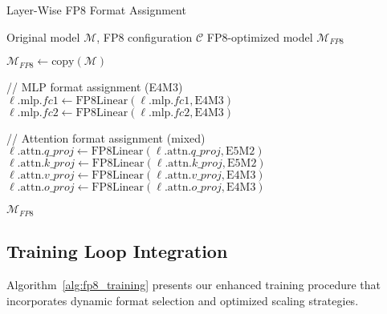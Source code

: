 \documentclass[conference]{IEEEtran}
\begin{document}
\begin{algorithm}[hbt!]
\caption{Layer-Wise FP8 Format Assignment}
\label{alg:layer_replacement}
\begin{algorithmic}
\Require Original model $\mathcal{M}$, FP8 configuration $\mathcal{C}$
\Ensure FP8-optimized model $\mathcal{M}_{FP8}$

\State $\mathcal{M}_{FP8} \gets \text{copy}(\mathcal{M})$

    \State // MLP format assignment (E4M3)
    \State $\ell.\text{mlp}.fc1 \gets \text{FP8Linear}(\ell.\text{mlp}.fc1, \text{E4M3})$
    \State $\ell.\text{mlp}.fc2 \gets \text{FP8Linear}(\ell.\text{mlp}.fc2, \text{E4M3})$
    
    \State // Attention format assignment (mixed)
    \State $\ell.\text{attn}.q\_proj \gets \text{FP8Linear}(\ell.\text{attn}.q\_proj, \text{E5M2})$
    \State $\ell.\text{attn}.k\_proj \gets \text{FP8Linear}(\ell.\text{attn}.k\_proj, \text{E5M2})$
    \State $\ell.\text{attn}.v\_proj \gets \text{FP8Linear}(\ell.\text{attn}.v\_proj, \text{E4M3})$
    \State $\ell.\text{attn}.o\_proj \gets \text{FP8Linear}(\ell.\text{attn}.o\_proj, \text{E4M3})$
\EndFor

\State \Return $\mathcal{M}_{FP8}$
\end{algorithmic}
\end{algorithm}

\subsection{Training Loop Integration}

Algorithm~\ref{alg:fp8_training} presents our enhanced training procedure that incorporates dynamic format selection and optimized scaling strategies.
\end{document}
